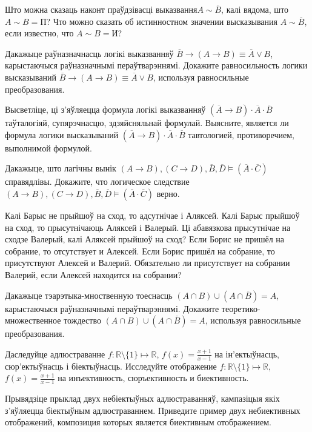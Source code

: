 \begin{problemList}
	
	\problemItemSimple
	{Што можна сказаць наконт праўдзівасці выказвання$A \sim \overline{B}$, калі вядома, што $A \sim B = \mbox{П}$?}
	{Что можно сказать об истинностном значении высказывания $A \sim \overline{B}$, если известно, что $A \sim B = \mbox{И}$?}
	
	\problemItemSimple
	{Дакажыце раўназначнасць логікі выказванняў $\overline{B} \to (A \to B) \equiv \overline{A} \vee B$, карыстаючыся раўназначнымі пераўтварэннямі.}
	{Докажите равносильность логики высказываний $\overline{B} \to (A \to B) \equiv \overline{A} \vee B$, используя равносильные преобразования.}
	
	\problemItemSimple
	{Высветліце, ці з'яўляецца формула логікі выказванняў $(\overline{A} \to B) \cdot \overline{A} \cdot \overline{B}$ таўталогіяй, супярэчнасцю, здзяйсняльнай формулай.}
	{Выясните, является ли формула логики высказываний $(\overline{A} \to B) \cdot \overline{A} \cdot \overline{B}$ тавтологией, противоречием, выполнимой формулой.}
	
	\problemItemSimple
	{Дакажыце, што лагічны вынік $(A \to B), (C \to D), \overline{B}, \overline{D} \models (\overline{A} \cdot \overline{C})$ справядлівы.}
	{Докажите, что логическое следствие $(A \to B), (C \to D), \overline{B}, \overline{D} \models (\overline{A} \cdot \overline{C})$ верно.}
	
	\problemItemSimple
	{Калі Барыс не прыйшоў на сход, то адсутнічае і Аляксей. Калі Барыс прыйшоў на сход, то прысутнічаюць Аляксей і Валерый. Ці абавязкова прысутнічае на сходзе Валерый, калі Аляксей прыйшоў на сход?}
	{Если Борис не пришёл на собрание, то отсутствует и Алексей. Если Борис пришёл на собрание, то присутствуют Алексей и Валерий. Обязательно ли присутствует на собрании Валерий, если Алексей находится на собрании?}
	
	\problemItemSimple
	{Дакажыце тэарэтыка-мноственную тоеснасць $(A \cap B) \cup (A \cap \overline{B}) = A$, карыстаючыся раўназначнымі пераўтварэннямі.}
	{Докажите теоретико-множественное тождество $(A \cap B) \cup (A \cap \overline{B}) = A$, используя равносильные преобразования.}
	
	\problemItemSimple
	{Даследуйце адлюстраванне $f: \mathbb{R} \setminus \{1\} \mapsto \mathbb{R}$, $f(x) = \frac{x+1}{x-1}$ на ін'ектыўнасць, сюр'ектыўнасць і біектыўнасць. }
	{Исследуйте отображение $f: \mathbb{R} \setminus \{1\} \mapsto \mathbb{R}$, $f(x) = \frac{x+1}{x-1}$ на инъективность, сюръективность и биективность.}
	
	\problemItemSimple
	{Прывядзіце прыклад двух небіектыўных адлюстраванняў, кампазіцыя якіх з'яўляецца біектыўным адлюстраваннем.}
	{Приведите пример двух небиективных отображений, композиция которых является биективным отображением.}
	
\end{problemList}	


